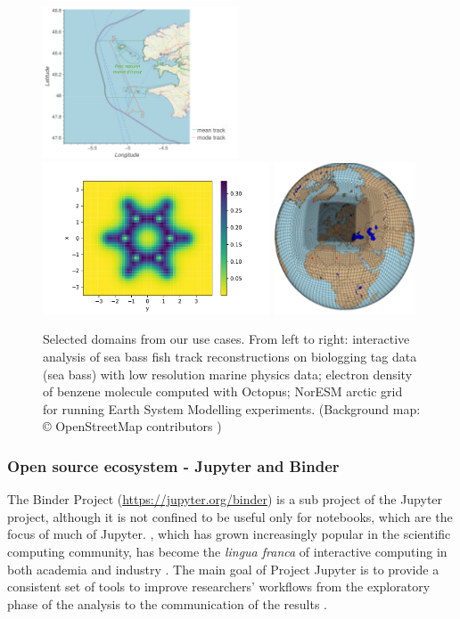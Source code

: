 \begin{figure}
  \includegraphics[height=4.5cm]{images/fish.png}\hfill
  \includegraphics[height=4.5cm]{images/octopus-benzene.pdf}\hfill\hspace{0.5cm}
  \includegraphics[height=4.5cm]{images/gg-a.png}
  \caption{Selected domains from our use cases. From left to right: interactive
    analysis of sea bass fish track reconstructions on biologging tag data (sea bass)
    with low resolution marine physics data; electron
    density of benzene molecule computed with Octopus; NorESM arctic grid for running Earth System Modelling experiments.
    (Background map: \copyright
    OpenStreetMap contributors ) \label{fig:applications}}
\end{figure}

\subsubsection{Open source ecosystem - Jupyter and Binder}\label{sec:opensource}

The Binder Project \cite{binder} (\url{https://jupyter.org/binder}) is
a sub project of the Jupyter project, although it is not confined to be
useful only for notebooks, which are the focus of much of Jupyter.
 \cite{Jupyter}, which has grown increasingly popular in the scientific
computing community, has become the \emph{lingua franca} of interactive
computing in both academia and industry \cite{Perkel2018}. The main goal of Project Jupyter
is to provide a consistent set of tools to improve researchers'
workflows from the exploratory phase of the analysis to the communication
of the results \cite{Kluyver2016,Granger2021}.

